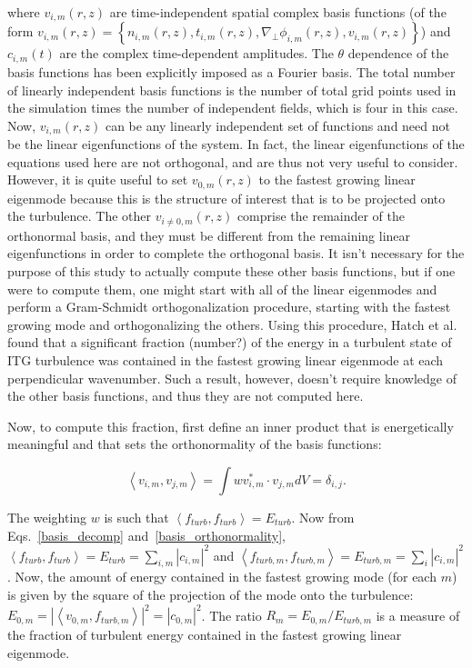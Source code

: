 \documentclass[showpacs,preprintnumbers,amsmath,amssymb,superscriptaddress,aip]{revtex4-1}
\def\beq{\begin{equation}}
\def\eeq{\end{equation}}
\def\grad{\nabla}
\newcommand{\gradperp}{\grad_\perp}
\begin{document}
where $v_{i,m}(r,z)$ are time-independent spatial complex basis functions (of the form $v_{i,m}(r,z) = \left\{ n_{i,m}(r,z),t_{i,m}(r,z),\gradperp \phi_{i,m}(r,z), v_{i,m}(r,z) \right\}$)
and $c_{i,m}(t)$ are the complex time-dependent amplitudes. The $\theta$ dependence of the basis functions has been explicitly imposed as a Fourier basis. The total number of
linearly independent basis functions is the number of total grid points used in the simulation times the number of independent fields, which is four in this case.
Now, $v_{i,m}(r,z)$ can be any linearly independent set of functions and need not be the linear eigenfunctions
of the system. In fact, the linear eigenfunctions of the equations used here are not orthogonal, and are thus not very useful to consider. However, it is quite useful to set $v_{0,m}(r,z)$ to the fastest
growing linear eigenmode because this is the structure of interest that is to be projected onto the turbulence. 
The other $v_{i \ne 0,m}(r,z)$ comprise the remainder of the orthonormal basis, and they must be different from
the remaining linear eigenfunctions in order to complete the orthogonal basis. It isn't necessary for the purpose of this study to actually compute these other basis functions, but if one were to compute
them, one might start with all of the linear eigenmodes
and perform a Gram-Schmidt orthogonalization procedure, starting with the fastest growing mode and orthogonalizing the others. Using this procedure, Hatch et al.~\cite{hatch2011}
found that a significant fraction (number?) of the energy in a turbulent state of ITG turbulence was contained in the fastest growing linear eigenmode at each perpendicular wavenumber.
Such a result, however, doesn't require knowledge of the other basis functions, and thus they are not computed here.

Now, to compute this fraction, first define an inner product that is energetically meaningful and that sets the orthonormality of the basis functions:

\beq
\label{basis_orthonormality}
\left< v_{i,m},v_{j,m} \right> = \int w v_{i,m}^* \cdot v_{j,m} dV = \delta_{i,j}.
\eeq

The weighting $w$ is such that $\left< f_{turb}, f_{turb} \right> = E_{turb}$.
Now from Eqs.~\ref{basis_decomp} and~\ref{basis_orthonormality}, $\left< f_{turb}, f_{turb} \right> = E_{turb} = \sum_{i,m} |c_{i,m}|^2$ and 
$\left< f_{turb,m}, f_{turb,m} \right> = E_{turb,m} = \sum_i |c_{i,m}|^2$.
Now, the amount of energy contained in the fastest growing mode (for each $m$) is given by the square of the projection
of the mode onto the turbulence: $E_{0,m} = \left| \left< v_{0,m}, f_{turb,m} \right> \right|^2 = |c_{0,m}|^2$. The ratio 
$R_m = E_{0,m}/E_{turb,m}$ is a measure of the fraction of turbulent energy contained in the fastest growing linear eigenmode. 
\end{document}
